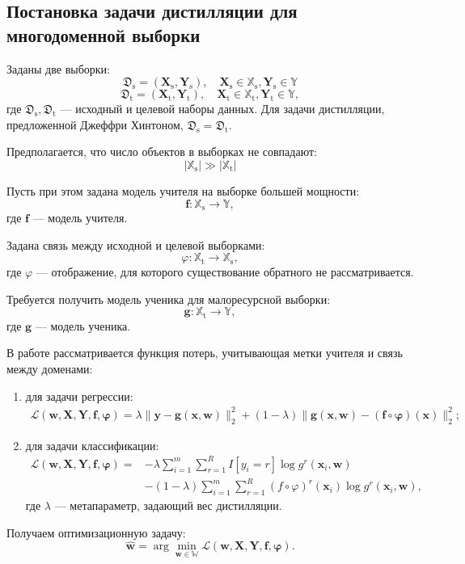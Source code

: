 \subsection{Постановка задачи дистилляции для многодоменной выборки}

Заданы две выборки:
$$\mathfrak{D}_{\text{s}}=(\mathbf{X}_{\text{s}},\mathbf{Y}_{\text{s}}), \quad \mathbf{X}_{\text{s}} \in \mathbb{X}_{\text{s}}, \mathbf{Y}_{\text{s}} \in \mathbb{Y}$$
$$\mathfrak{D}_{\text{t}}=(\mathbf{X}_{\text{t}},\mathbf{Y}_{\text{t}}), \quad \mathbf{X}_{\text{t}} \in \mathbb{X}_{\text{t}}, \mathbf{Y}_{\text{t}} \in \mathbb{Y},$$
где $\mathfrak{D}_{\text{s}}, \mathfrak{D}_{\text{t}}$ --- исходный и целевой наборы данных. Для задачи дистилляции, предложенной Джеффри Хинтоном, $\mathfrak{D}_{\text{s}}=\mathfrak{D}_{\text{t}}$.

Предполагается, что число объектов в выборках не совпадают:
$$|\mathbb{X}_{\text{s}}| \gg |\mathbb{X}_{\text{t}}|$$

Пусть при этом задана модель учителя на выборке большей мощности:
$$\mathbf{f}: \mathbb{X}_{\text{s}} \rightarrow \mathbb{Y},$$
где $\mathbf{f}$ --- модель учителя.

Задана связь между исходной и целевой выборками:
$$\varphi: \mathbb{X}_{\text{t}} \rightarrow \mathbb{X}_{\text{s}},$$
где $\varphi$ --- отображение, для которого существование обратного не рассматривается.

Требуется получить модель ученика для малоресурсной выборки:
$$\mathbf{g}: \mathbb{X}_{\text{t}} \rightarrow \mathbb{Y},$$
где $\mathbf{g}$ --- модель ученика.

В работе рассматривается функция потерь, учитывающая метки учителя и связь между доменами:
\begin{enumerate}
    \item для задачи регрессии:
    \[
    \begin{aligned}
    \mathcal{L}(\mathbf{w,X,Y,f,\varphi})=\lambda\|\mathbf{y}-\mathbf{g}(\mathbf{x},\mathbf{w})\|_{2}^{2}+(1-\lambda)\|\mathbf{g}(\mathbf{x},\mathbf{w})-(\mathbf{f}\circ \mathbf{\varphi})(\mathbf{x})\|_{2}^{2};
    \end{aligned}
    \]
    \item для задачи классификации:
    \[
    \begin{aligned}
    \mathcal{L}(\mathbf{w,X,Y,f,\varphi})=&-\lambda\sum\limits_{i=1}^{m}\sum\limits_{r=1}^{R}I[y_{i}=r]\log{g^{r}(\mathbf{x}_{i},\mathbf{w})}\\
    &-(1-\lambda)\sum\limits_{i=1}^{m}\sum\limits_{r=1}^{R}(f\circ \varphi)^{r}(\mathbf{x}_{i})\log{g^{r}(\mathbf{x}_{i},\mathbf{w})},
    \end{aligned}
    \]
    где $\lambda$ --- метапараметр, задающий вес дистилляции.
\end{enumerate}

Получаем оптимизационную задачу:
$$\hat{\mathbf{w}} = \arg\min_{\mathbf{w} \in \mathbb{W}} \mathcal{L}(\mathbf{w,X,Y,f,\varphi}).$$
